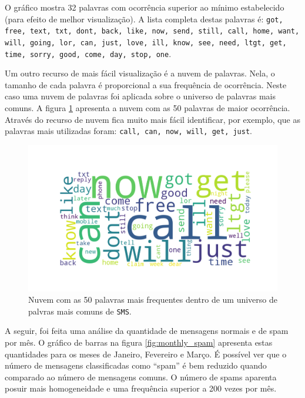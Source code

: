 \documentclass[a4paper,11pt]{article}
\begin{document}
O gráfico mostra 32 palavras com ocorrência superior ao mínimo estabelecido (para efeito de melhor
visualização). A lista completa destas palavras é: \texttt{got, free, text, txt, dont, back, 
like, now, send, still, call, home, want, will, going, lor, can, just, love, ill, know, see, need, 
ltgt, get, time, sorry, good, come, day, stop, one}.

Um outro recurso de mais fácil visualização é a nuvem de palavras. Nela, o tamanho de cada palavra 
é proporcional a sua frequência de ocorrência. Neste caso uma nuvem de palavras foi aplicada sobre 
o universo de palavras mais comuns. A figura \ref{fig:wordcloud} apresenta a nuvem com as 50 palavras 
de maior ocorrência. Através do recurso de nuvem fica muito mais fácil identificar, por exemplo,
que as palavras mais utilizadas foram: \texttt{call, can, now, will, get, just}.


\begin{figure}[htbp]
    \centering
    \includegraphics[width=\textwidth]{word_cloud.png}
    \caption[Figura simples]{Nuvem com as 50 palavras mais frequentes dentro de um universo de 
    palvras mais comuns de \texttt{SMS}.}
    \label{fig:wordcloud}
\end{figure}


\newpage
A seguir, foi feita uma análise da quantidade de mensagens normais e de spam por mês. O 
gráfico de barras na figura \ref{fig:monthly_spam} apresenta estas quantidades para os meses de Janeiro, Fevereiro 
e Março. É possível ver que o número de mensagens classificadas como ``spam'' é bem reduzido 
quando comparado ao número de mensagens comuns. O número de spams aparenta posuir mais 
homogeneidade e uma frequência superior a 200 vezes por mês.
\end{document}
